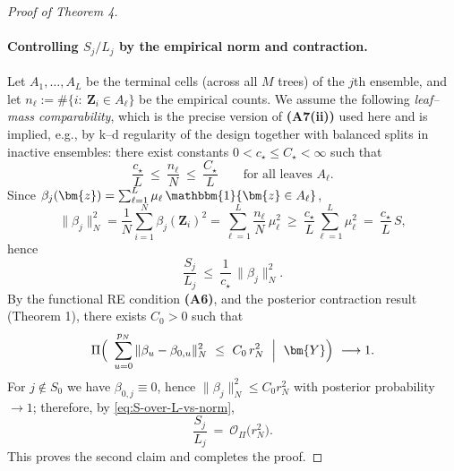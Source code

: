 \documentclass[11pt]{article}
\theoremstyle{plain}
\theoremstyle{definition}
\theoremstyle{plain}
\begin{document}
\begin{proof}[Proof of Theorem 4]
\paragraph{Controlling $S_j/L_j$ by the empirical norm and contraction.}
Let $A_1,\dots,A_L$ be the terminal cells (across all $M$ trees) of the $j$th
ensemble, and let $n_\ell:=\#\{i:\ \bm Z_i\in A_\ell\}$ be the empirical
counts.  We assume the following \emph{leaf--mass comparability}, which is the precise version of \textbf{(A7(ii))} used here and is implied, e.g., by k--d regularity of the design together with balanced splits in inactive ensembles:
there exist constants $0<c_\star\le C_\star<\infty$ such that
\begin{equation}
\label{eq:leaf-mass}
\frac{c_\star}{L}\ \le\ \frac{n_\ell}{N}\ \le\ \frac{C_\star}{L}
\qquad\text{for all leaves }A_\ell.
\end{equation}
Since $\beta_j(\bm{z})=\sum_{\ell=1}^L \mu_\ell\,\mathbbm{1}\{\bm{z}\in A_\ell\}$,
\[
\|\beta_j\|_N^2
= \frac1N\sum_{i=1}^N \beta_j(\bm Z_i)^2
= \sum_{\ell=1}^L \frac{n_\ell}{N}\,\mu_\ell^2
\ \ge\ \frac{c_\star}{L}\sum_{\ell=1}^L \mu_\ell^2
\ =\ \frac{c_\star}{L}\,S,
\]
hence
\begin{equation}
\label{eq:S-over-L-vs-norm}
\frac{S_j}{L_j}\ \le\ \frac{1}{c_\star}\,\|\beta_j\|_N^2.
\end{equation}
By the functional RE condition \textbf{(A6)}, and the posterior contraction result (Theorem 1), there exists $C_0>0$ such that
\[
\Pi\Big(\ \sum_{u=0}^{p_N}\|\beta_u-\beta_{0,u}\|_N^2
\ \le\ C_0\, r_N^2\ \Bigm|\ \bm{Y}\Big)\ \longrightarrow 1.
\]
For $j\notin S_0$ we have $\beta_{0,j}\equiv 0$, hence $\|\beta_j\|_N^2\le C_0 r_N^2$ with posterior probability $\to1$; therefore, by \eqref{eq:S-over-L-vs-norm},
\[
\frac{S_j}{L_j}\ =\ \mathcal O_\Pi\big(r_N^2\big).
\]
This proves the second claim and completes the proof.
\end{proof}


\end{document}
